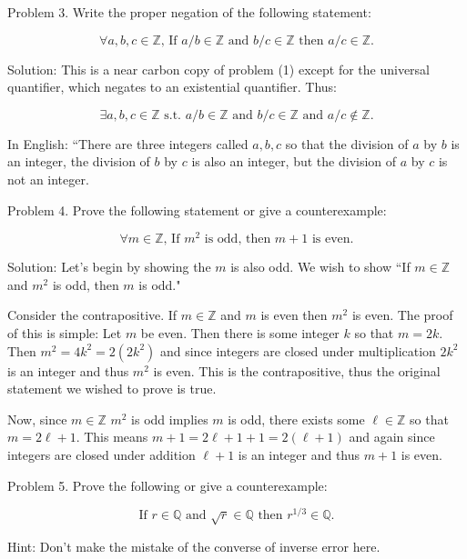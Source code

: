 \documentclass[16 pt]{amsart}
\theoremstyle{definition}
\theoremstyle{remark}
\numberwithin{equation}{subsection}
\newcommand{\Z}{\mathbb{Z}}
\newcommand{\Q}{\mathbb{Q}}
\begin{document}
\newpage

Problem 3. Write the proper negation of the following statement:

\[
\forall a,b,c\in\Z \text{, If } a/b\in\Z \text{ and } b/c\in\Z \text{ then } a/c\in\Z.
\]

\vspace{1in}

Solution:  This is a near carbon copy of problem (1) except for the universal quantifier, which negates to an existential quantifier.  Thus:

\[
\exists a,b,c\in\Z \text{ s.t. } a/b\in\Z \text{ and } b/c\in\Z \text{ and } a/c\notin\Z.
\]

In English: ``There are three integers called $a,b,c$ so that the division of $a$ by $b$ is an integer, the division of $b$ by $c$ is also an integer, but the division of $a$ by $c$ is not an integer.


\newpage

Problem 4. Prove the following statement or give a counterexample:

\[
\forall m\in\Z \text{, If } m^2 \text{ is odd, then } m+1 \text{ is even.}
\]


\vspace{1in}

Solution: Let's begin by showing the $m$ is also odd.  We wish to show ``If $m\in\Z$ and $m^2$ is odd, then $m$ is odd."

Consider the contrapositive.  If $m\in \Z$ and $m$ is even then $m^2$ is even.  The proof of this is simple:  Let $m$ be even.  Then there is some integer $k$ so that $m=2k.$  Then $m^2 = 4k^2 = 2(2k^2)$ and since integers are closed under multiplication $2k^2$ is an integer and thus $m^2$ is even.  This is the contrapositive, thus the original statement we wished to prove is true.

Now, since $m\in\Z$ $m^2$ is odd implies $m$ is odd, there exists some $\ell\in\Z$ so that $m=2\ell+1$.  This means $m+1 = 2\ell +1 +1 = 2(\ell+1)$ and again since integers are closed under addition $\ell+1$ is an integer and thus $m+1$ is even.

\newpage

Problem 5. Prove the following or give a counterexample:

\[
\text{If } r\in\Q \text{ and } \sqrt{r}\in\Q \text{ then } r^{1/3}\in\Q.
\]

Hint: Don't make the mistake of the converse of inverse error here.


\vspace{1in}
\end{document}
